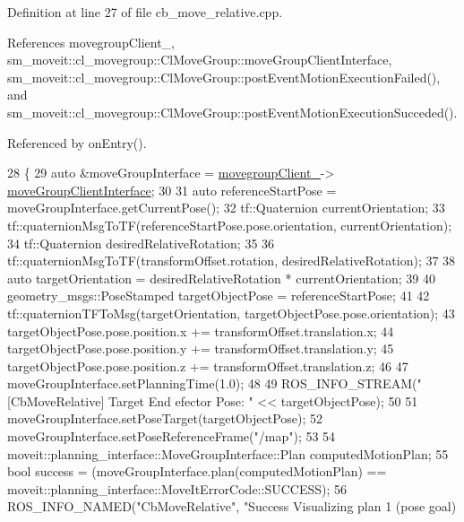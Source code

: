 Definition at line 27 of file cb\+\_\+move\+\_\+relative.\+cpp.



References movegroup\+Client\+\_\+, sm\+\_\+moveit\+::cl\+\_\+movegroup\+::\+Cl\+Move\+Group\+::move\+Group\+Client\+Interface, sm\+\_\+moveit\+::cl\+\_\+movegroup\+::\+Cl\+Move\+Group\+::post\+Event\+Motion\+Execution\+Failed(), and sm\+\_\+moveit\+::cl\+\_\+movegroup\+::\+Cl\+Move\+Group\+::post\+Event\+Motion\+Execution\+Succeded().



Referenced by on\+Entry().


\begin{DoxyCode}
28 \{
29     \textcolor{keyword}{auto} &moveGroupInterface = \hyperlink{classsm__moveit_1_1cl__movegroup_1_1CbMoveRelative_a4b514e5a58afa0052777268626423ece}{movegroupClient\_}->
      \hyperlink{classsm__moveit_1_1cl__movegroup_1_1ClMoveGroup_a23acf6883455566dbab30e4367c2144d}{moveGroupClientInterface};
30 
31     \textcolor{keyword}{auto} referenceStartPose = moveGroupInterface.getCurrentPose();
32     tf::Quaternion currentOrientation;
33     tf::quaternionMsgToTF(referenceStartPose.pose.orientation, currentOrientation);
34     tf::Quaternion desiredRelativeRotation;
35 
36     tf::quaternionMsgToTF(transformOffset.rotation, desiredRelativeRotation);
37 
38     \textcolor{keyword}{auto} targetOrientation = desiredRelativeRotation * currentOrientation;
39 
40     geometry\_msgs::PoseStamped targetObjectPose = referenceStartPose;
41 
42     tf::quaternionTFToMsg(targetOrientation, targetObjectPose.pose.orientation);
43     targetObjectPose.pose.position.x += transformOffset.translation.x;
44     targetObjectPose.pose.position.y += transformOffset.translation.y;
45     targetObjectPose.pose.position.z += transformOffset.translation.z;
46 
47     moveGroupInterface.setPlanningTime(1.0);
48 
49     ROS\_INFO\_STREAM(\textcolor{stringliteral}{"[CbMoveRelative] Target End efector Pose: "} << targetObjectPose);
50 
51     moveGroupInterface.setPoseTarget(targetObjectPose);
52     moveGroupInterface.setPoseReferenceFrame(\textcolor{stringliteral}{"/map"});
53 
54     moveit::planning\_interface::MoveGroupInterface::Plan computedMotionPlan;
55     \textcolor{keywordtype}{bool} success = (moveGroupInterface.plan(computedMotionPlan) == 
      moveit::planning\_interface::MoveItErrorCode::SUCCESS);
56     ROS\_INFO\_NAMED(\textcolor{stringliteral}{"CbMoveRelative"}, \textcolor{stringliteral}{"Success Visualizing plan 1 (pose goal) %
}
\end{DoxyCode}
